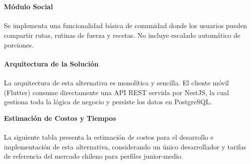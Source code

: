 \documentclass[12pt]{article}
\begin{document}
\\\\
\textbf{Módulo Social}
\\\\
Se implementa una funcionalidad básica de comunidad donde los usuarios pueden compartir rutas, rutinas de fuerza y recetas. No incluye escalado automático de porciones.
\\\\
\textbf{Arquitectura de la Solución}
\\\\
La arquitectura de esta alternativa es monolítica y sencilla. El cliente móvil (Flutter) consume directamente una API REST servida por NestJS, la cual gestiona toda la lógica de negocio y persiste los datos en PostgreSQL.

\vspace{0.5cm}
\begin{center}
\end{center}
\vspace{0.5cm}

\textbf{Estimación de Costos y Tiempos}
\\\\
La siguiente tabla presenta la estimación de costos para el desarrollo e implementación de esta alternativa, considerando un único desarrollador y tarifas de referencia del mercado chileno para perfiles junior-medio.
\end{document}
